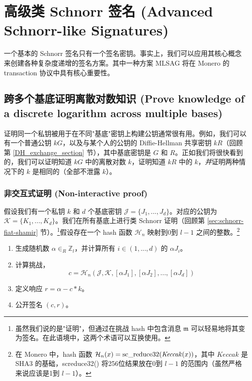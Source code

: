 \chapter{高级类 Schnorr 签名 (Advanced Schnorr-like Signatures)}
\label{chapter:advanced-schnorr}

一个基本的 Schnorr 签名只有一个签名密钥。事实上，我们可以应用其核心概念来创建各种复杂度递增的签名方案。其中一种方案 MLSAG 将在 Monero 的 transaction 协议中具有核心重要性。



\section{跨多个基底证明离散对数知识 (Prove knowledge of a discrete logarithm across multiple bases)}
\label{sec:proofs-discrete-logarithm-multiple-bases}

证明同一个私钥被用于在不同"基底"密钥上构建公钥通常很有用。例如，我们可以有一个普通公钥 $k G$，以及与某个人的公钥的 Diffie-Hellman 共享密钥 $k R$（回顾第 \ref{DH_exchange_section} 节），其中基底密钥是 $G$ 和 $R$。正如我们将很快看到的，我们可以证明知道 $k G$ 中的离散对数 $k$，证明知道 $k R$ 中的 $k$，{\em 并}证明两种情况下的 $k$ 是相同的（全部不泄露 $k$）。


\subsection*{非交互式证明 (Non-interactive proof)}

假设我们有一个私钥 $k$ 和 $d$ 个基底密钥 $\mathcal{J} = \{J_1,...,J_d\}$。对应的公钥为 $\mathcal{K} = \{K_1,...,K_d\}$。我们在所有基底上进行类 Schnorr 证明（回顾第 \ref{sec:schnorr-fiat-shamir} 节）。\footnote{虽然我们说的是"证明"，但通过在挑战 hash 中包含消息 $\mathfrak{m}$ 可以轻易地将其变为签名。在此语境中，这两个术语可以互换使用。}假设存在一个 hash 函数 \(\mathcal{H}_n\)
映射到0到 $l-1$ 之间的整数。\footnote{在 Monero 中，hash 函数 $\mathcal{H}_n(x) = \textrm{sc\textunderscore reduce32}(\mathit{Keccak}(x))$，其中 $\mathit{Keccak}$ 是 SHA3 的基础，sc\textunderscore reduce32() 将256位结果放在0到 $l-1$ 的范围内（虽然严格来说应该是1到 $l-1$）。}

\begin{enumerate}
	\item 生成随机数 $\alpha \in_R \mathbb{Z}_l$，并计算所有 $i \in (1,...,d)$ 的 $\alpha J_i$。
	\item 计算挑战，\vspace{.175cm}
	\[c = \mathcal{H}_n(\mathcal{J},\mathcal{K},[\alpha J_1],[\alpha J_2],...,[\alpha J_d])\]
	\item 定义响应 $r = \alpha - c*k$。
	\item 公开签名 $(c, r)$。
\end{enumerate}


